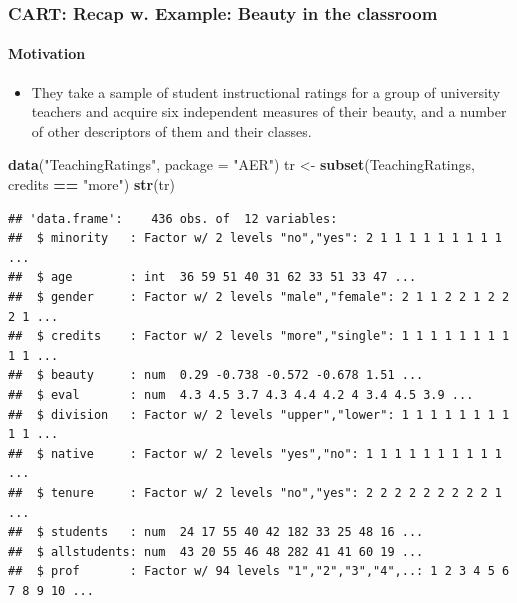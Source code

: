 \documentclass[
  shownotes,
  xcolor={svgnames},
  hyperref={colorlinks,citecolor=DarkBlue,linkcolor=DarkRed,urlcolor=DarkBlue}
  , aspectratio=169]{beamer}
\newenvironment{Shaded}{\begin{snugshade}}{\end{snugshade}}
\newcommand{\DataTypeTok}[1]{\textcolor[rgb]{0.13,0.29,0.53}{#1}}
\newcommand{\KeywordTok}[1]{\textcolor[rgb]{0.13,0.29,0.53}{\textbf{#1}}}
\newcommand{\NormalTok}[1]{#1}
\newcommand{\OperatorTok}[1]{\textcolor[rgb]{0.81,0.36,0.00}{\textbf{#1}}}
\newcommand{\StringTok}[1]{\textcolor[rgb]{0.31,0.60,0.02}{#1}}
\begin{document}
\begin{frame}[fragile]
\frametitle{CART: Recap w. Example: Beauty in the classroom}
\framesubtitle{Motivation}


\begin{itemize}
\item They take a sample of student instructional ratings for a group of university teachers and acquire six independent measures of their beauty, and a number of other descriptors of them and their classes. 
\end{itemize}


\begin{scriptsize}
\begin{Shaded}
\begin{Highlighting}[]
\KeywordTok{data}\NormalTok{(}\StringTok{"TeachingRatings"}\NormalTok{, }\DataTypeTok{package =} \StringTok{"AER"}\NormalTok{)}
\NormalTok{tr \textless{}{-}}\StringTok{ }\KeywordTok{subset}\NormalTok{(TeachingRatings, credits }\OperatorTok{==}\StringTok{ "more"}\NormalTok{)}
\KeywordTok{str}\NormalTok{(tr)}
\end{Highlighting}
\end{Shaded}

\end{scriptsize}
\begin{tiny}

\begin{verbatim}
## 'data.frame':    436 obs. of  12 variables:
##  $ minority   : Factor w/ 2 levels "no","yes": 2 1 1 1 1 1 1 1 1 1 ...
##  $ age        : int  36 59 51 40 31 62 33 51 33 47 ...
##  $ gender     : Factor w/ 2 levels "male","female": 2 1 1 2 2 1 2 2 2 1 ...
##  $ credits    : Factor w/ 2 levels "more","single": 1 1 1 1 1 1 1 1 1 1 ...
##  $ beauty     : num  0.29 -0.738 -0.572 -0.678 1.51 ...
##  $ eval       : num  4.3 4.5 3.7 4.3 4.4 4.2 4 3.4 4.5 3.9 ...
##  $ division   : Factor w/ 2 levels "upper","lower": 1 1 1 1 1 1 1 1 1 1 ...
##  $ native     : Factor w/ 2 levels "yes","no": 1 1 1 1 1 1 1 1 1 1 ...
##  $ tenure     : Factor w/ 2 levels "no","yes": 2 2 2 2 2 2 2 2 2 1 ...
##  $ students   : num  24 17 55 40 42 182 33 25 48 16 ...
##  $ allstudents: num  43 20 55 46 48 282 41 41 60 19 ...
##  $ prof       : Factor w/ 94 levels "1","2","3","4",..: 1 2 3 4 5 6 7 8 9 10 ...
\end{verbatim}


\end{tiny}   
\end{frame}
\end{document}
